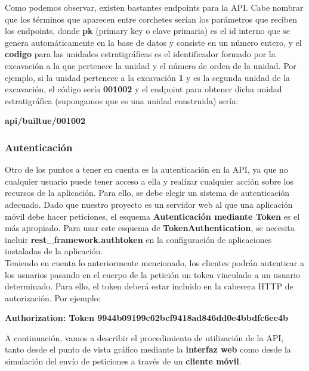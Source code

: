 Como podemos observar, existen bastantes endpoints para la API. Cabe nombrar que los
términos que aparecen entre corchetes serían los parámetros que reciben los endpoints,
donde \textbf{pk} (primary key o clave primaria) es el id interno que se genera
automáticamente en la base de datos y consiste en un número entero, y el \textbf{codigo}
para las unidades estratigráficas es el identificador formado por la excavación a la
que pertenece la unidad y el número de orden de la unidad. Por ejemplo, si la unidad
pertenece a la excavación \textbf{1} y es la segunda unidad de la excavación, el código
sería \textbf{001002} y el endpoint para obtener dicha unidad estratigráfica (supongamos
que es una unidad construida) sería:

            \begin{center} \textbf{api/builtue/001002} \end{center}

\subsubsection{Autenticación}
Otro de los puntos a tener en cuenta es la autenticación en la API, ya que no cualquier
usuario puede tener acceso a ella y realizar cualquier acción sobre los recursos de la
aplicación. Para ello, se debe elegir un sistema de autenticación adecuado. Dado que
nuestro proyecto es un servidor web al que una aplicación móvil debe hacer peticiones,
el esquema \textbf{Autenticación mediante Token} es el más apropiado. Para usar este
esquema de \textbf{TokenAuthentication}, se necesita incluir \textbf{rest\_framework.authtoken}
en la configuración de aplicaciones instaladas de la aplicación.\\

Teniendo en cuenta lo anteriormente mencionado, los clientes podrán autenticar a los usuarios
pasando en el cuerpo de la petición un token vinculado a un usuario determinado. Para
ello, el token deberá estar incluido en la cabecera HTTP de autorización. Por ejemplo:

\begin{center}
    \textbf{Authorization: Token 9944b09199c62bcf9418ad846dd0e4bbdfc6ee4b}
\end{center}

A continuación, vamos a describir el procedimiento de utilización de la API, tanto desde el
punto de vista gráfico mediante la \textbf{interfaz web} como desde la simulación del envío
de peticiones a través de un \textbf{cliente móvil}.\\

